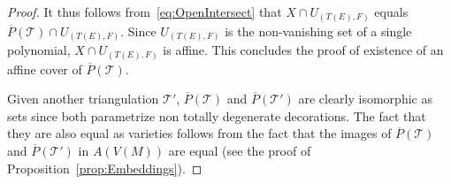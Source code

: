 \documentclass[11pt]{amsart}
\theoremstyle{plain}
\theoremstyle{definition}
\newtheorem{remark}[theorem]{Remark}
\numberwithin{equation}{section}
\newcommand{\C}{\mathbb C}
\newcommand{\T}{\mathcal T}
\newcommand{\E}{\mathcal E}
\newcommand{\Vector}[2]{\left(\begin{smallmatrix}#1\\#2\end{smallmatrix}\right)}
\begin{document}
\begin{proof}
It thus follows from~\eqref{eq:OpenIntersect} that $X\cap U_{(T(E),F)}$ equals $\overline P(\T)\cap U_{(T(E),F)}$.
Since $U_{(T(E),F)}$ is the non-vanishing set of a single polynomial, $X\cap U_{(T(E),F)}$ is affine.
This concludes the proof of existence of an affine cover of $\overline P(\T)$.

Given another triangulation $\T'$, $\overline P(\T)$ and $\overline P(\T')$ are clearly isomorphic as sets since both parametrize non totally degenerate decorations. The fact that they are also equal as varieties follows from the fact that the images of $\overline P(\T)$ and $\overline P(\T')$ in $A(V(M))$ are equal (see the proof of Proposition~\ref{prop:Embeddings}).  
\end{proof}



\end{document}

